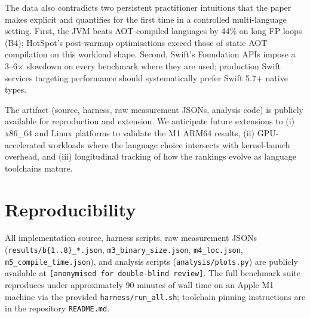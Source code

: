 \documentclass[10pt,conference]{IEEEtran}
\begin{document}
The data also contradicts two persistent practitioner intuitions
that the paper makes explicit and quantifies for the first time
in a controlled multi-language setting. First, the JVM beats
AOT-compiled languages by 44\% on long FP loops (B4); HotSpot's
post-warmup optimisations exceed those of static AOT compilation
on this workload shape. Second, Swift's Foundation APIs impose
a 3--6$\times$ slowdown on every benchmark where they are used;
production Swift services targeting performance should
systematically prefer Swift 5.7+ native types.

The artifact (source, harness, raw measurement JSONs, analysis
code) is publicly available for reproduction and extension. We
anticipate future extensions to (i) x86\_64 and Linux platforms
to validate the M1 ARM64 results, (ii) GPU-accelerated workloads
where the language choice intersects with kernel-launch overhead,
and (iii) longitudinal tracking of how the rankings evolve as
language toolchains mature.

\section*{Reproducibility}

All implementation source, harness scripts, raw measurement
JSONs (\texttt{results/b\{1..8\}\_*.json},
\texttt{m3\_binary\_size.json}, \texttt{m4\_loc.json},
\texttt{m5\_compile\_time.json}), and analysis scripts
(\texttt{analysis/plots.py}) are publicly available at
\texttt{[anonymised for double-blind review]}. The full benchmark
suite reproduces under approximately 90 minutes of wall time on
an Apple M1 machine via the provided
\texttt{harness/run\_all.sh}; toolchain pinning instructions are
in the repository \texttt{README.md}.


\end{document}
